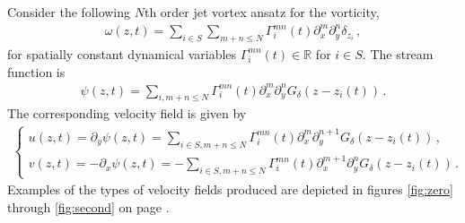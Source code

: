 \documentclass[12pt]{amsart}
\newcommand{\R}{\ensuremath{\mathbb{R}}}
\theoremstyle{remark}
\begin{document}
%
Consider the following $N$th order jet vortex ansatz for the vorticity,
\begin{align}
  \omega(z,t) = \sum_{i \in S} \sum_{m+n \leq N} \Gamma^{mn}_i(t) \partial_x^m \partial_y^n \delta_{z_i} \,,
  \label{eq:ansatz N}
\end{align}
for spatially constant dynamical variables $\Gamma^{mn}_i(t) \in \R$ for $i \in S$.
The stream function is 
\begin{align*}
  \psi(z,t) = \sum_{i, m+n \leq N} \Gamma^{mn}_i(t) \partial_x^m \partial_y^n G_\delta (z-z_i(t) )
\,.\end{align*}
The corresponding velocity field is given by
\begin{align}
\begin{cases}
  u(z,t) = \partial_y \psi(z,t) =  \sum_{i \in S,m+n \leq N} \Gamma^{mn}_i(t) \partial_x^m \partial_y^{n+1} G_\delta (z-z_i(t) )
  \,, \\
  v(z,t) = -\partial_x \psi(z,t) =  - \sum_{i \in S, m+n \leq N} \Gamma^{mn}_i(t) \partial_x^{m+1} \partial_y^n G_\delta (z-z_i(t) )\,.
\end{cases} \label{eq:u N}
\end{align}
Examples of the types of velocity fields produced are depicted in figures \ref{fig:zero} through \ref{fig:second} on page \pageref{fig:zero}.
\end{document}
